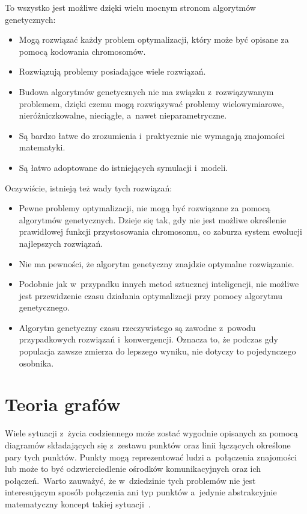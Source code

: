 \documentclass[twoside,12pt]{report}
\begin{document}
To wszystko jest możliwe dzięki wielu mocnym stronom algorytmów genetycznych:
\begin{itemize}
\item Mogą rozwiązać każdy problem optymalizacji, który może być opisane za pomocą kodowania chromosomów.
\item Rozwiązują problemy posiadające wiele rozwiązań.
\item Budowa algorytmów genetycznych nie ma związku z~rozwiązywanym problemem, dzięki czemu mogą rozwiązywać problemy wielowymiarowe, nieróżniczkowalne, nieciągłe, a~nawet nieparametryczne.
\item Są bardzo łatwe do zrozumienia i~praktycznie nie wymagają znajomości matematyki.
\item Są łatwo adoptowane do istniejących symulacji i~modeli.
\end{itemize}

Oczywiście, istnieją też wady tych rozwiązań:
\begin{itemize}
\item Pewne problemy optymalizacji, nie mogą być rozwiązane za pomocą algorytmów genetycznych. Dzieje się tak, gdy nie jest możliwe określenie prawidłowej funkcji przystosowania chromosomu, co zaburza system ewolucji najlepszych rozwiązań.
\item Nie ma pewności, że algorytm genetyczny znajdzie optymalne rozwiązanie.
\item Podobnie jak w~przypadku innych metod sztucznej inteligencji, nie możliwe jest przewidzenie czasu działania optymalizacji przy pomocy algorytmu genetycznego.
\item Algorytm genetyczny czasu rzeczywistego są zawodne z~powodu przypadkowych rozwiązań i~konwergencji. Oznacza to, że podczas gdy populacja zawsze zmierza do lepszego wyniku, nie dotyczy to pojedynczego osobnika.
\end{itemize}

\section{Teoria grafów}
Wiele sytuacji z~życia codziennego może zostać wygodnie opisanych za pomocą diagramów składających się z~zestawu punktów oraz linii łączących określone pary tych punktów. Punkty mogą reprezentować ludzi a~połączenia znajomości lub może to być odzwierciedlenie ośrodków komunikacyjnych oraz ich połączeń.~Warto zauważyć, że w~dziedzinie tych problemów nie jest interesującym sposób połączenia ani typ punktów a~jedynie abstrakcyjnie matematyczny koncept takiej sytuacji~\cite{teoria-grafow-z-zast}.
\end{document}
